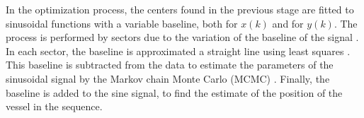 \documentclass[10pt,a4paper,report]{article}
\begin{document}

In the optimization process, the centers found in the previous stage are fitted to sinusoidal functions with a variable baseline, both for $x(k)$ and for $y(k)$. The process is performed by sectors due to the variation of the baseline of the signal . In each sector, the baseline is approximated a straight line using least squares \cite{press2007}. This baseline is subtracted from the data to estimate the parameters of the sinusoidal signal by the Markov chain Monte Carlo (MCMC) \cite{press2007}. Finally, the baseline is added to the sine signal, to find the estimate of the position of the vessel in the sequence.

\end{document}
